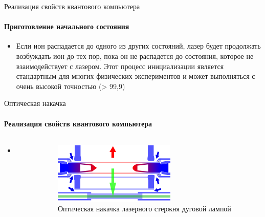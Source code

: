 \documentclass{beamer}
\begin{document}
    \begin{frame}{Реализация свойств квантового компьютера}
    \framesubtitle{Приготовление начального состояния}

    \begin{itemize}
            \item <1-> Если ион распадается до одного из других состояний, лазер будет продолжать возбуждать ион до тех пор, пока он не распадется до состояния, которое не взаимодействует с лазером. Этот процесс инициализации является стандартным для многих физических экспериментов и может выполняться с очень высокой точностью (> 99,9)
    \end{itemize}

    \end{frame}

    \begin{frame}{Оптическая накачка}
    \framesubtitle{Реализация свойств квантового компьютера}

    \begin{columns}

        \begin{column}{0.5\textwidth}

            \begin{itemize}
                \item 
            \end{itemize}

        \end{column}

        \begin{column}{0.5\textwidth}

            \begin{figure}
                \centering
                \includegraphics[width=\textwidth]{media/optical-pumping.png}
                \caption{Оптическая накачка лазерного стержня дуговой лампой}
            \end{figure}

        \end{column}

        \end{columns}

    \end{frame}
\end{document}

